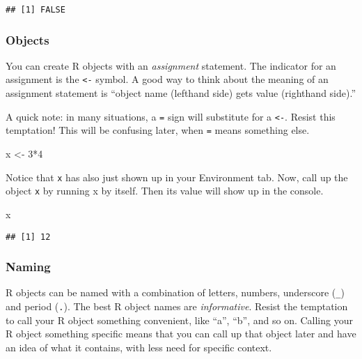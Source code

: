 \documentclass[
]{article}
\newenvironment{Shaded}{\begin{snugshade}}{\end{snugshade}}
\newcommand{\DecValTok}[1]{\textcolor[rgb]{0.00,0.00,0.81}{#1}}
\newcommand{\NormalTok}[1]{#1}
\newcommand{\OtherTok}[1]{\textcolor[rgb]{0.56,0.35,0.01}{#1}}
\newcommand{\SpecialCharTok}[1]{\textcolor[rgb]{0.00,0.00,0.00}{#1}}
\begin{document}
\begin{verbatim}
## [1] FALSE
\end{verbatim}

\hypertarget{objects}{%
\subsubsection{Objects}\label{objects}}

You can create R objects with an \emph{assignment} statement. The
indicator for an assignment is the \texttt{\textless{}-} symbol. A good
way to think about the meaning of an assignment statement is ``object
name (lefthand side) gets value (righthand side).''

A quick note: in many situations, a \texttt{=} sign will substitute for
a \texttt{\textless{}-}. Resist this temptation! This will be confusing
later, when \texttt{=} means something else.

\begin{Shaded}
\begin{Highlighting}[]
\NormalTok{x }\OtherTok{\textless{}{-}} \DecValTok{3}\SpecialCharTok{*}\DecValTok{4}
\end{Highlighting}
\end{Shaded}

Notice that \texttt{x} has also just shown up in your Environment tab.
Now, call up the object \texttt{x} by running x by itself. Then its
value will show up in the console.

\begin{Shaded}
\begin{Highlighting}[]
\NormalTok{x}
\end{Highlighting}
\end{Shaded}

\begin{verbatim}
## [1] 12
\end{verbatim}

\hypertarget{naming}{%
\subsubsection{Naming}\label{naming}}

R objects can be named with a combination of letters, numbers,
underscore (\texttt{\_}) and period (\texttt{.}). The best R object
names are \emph{informative}. Resist the temptation to call your R
object something convenient, like ``a'', ``b'', and so on. Calling your
R object something specific means that you can call up that object later
and have an idea of what it contains, with less need for specific
context.
\end{document}
